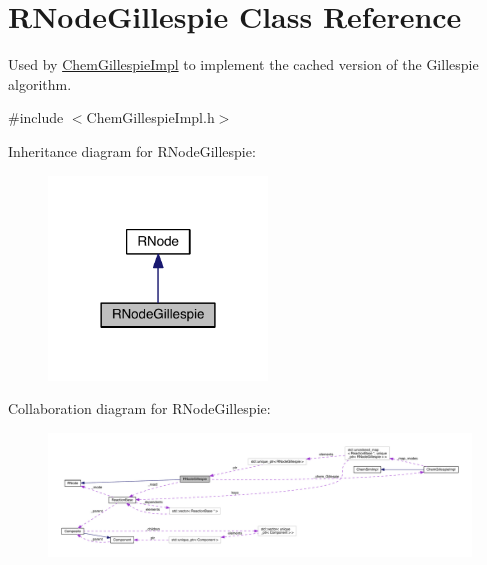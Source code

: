 \hypertarget{classRNodeGillespie}{\section{R\+Node\+Gillespie Class Reference}
\label{classRNodeGillespie}
}


Used by \hyperlink{classChemGillespieImpl}{Chem\+Gillespie\+Impl} to implement the cached version of the Gillespie algorithm.  




{\ttfamily \#include $<$Chem\+Gillespie\+Impl.\+h$>$}



Inheritance diagram for R\+Node\+Gillespie\+:\nopagebreak
\begin{figure}[H]
\begin{center}
\leavevmode
\includegraphics[width=165pt]{classRNodeGillespie__inherit__graph}
\end{center}
\end{figure}


Collaboration diagram for R\+Node\+Gillespie\+:
\nopagebreak
\begin{figure}[H]
\begin{center}
\leavevmode
\includegraphics[width=350pt]{classRNodeGillespie__coll__graph}
\end{center}
\end{figure}
